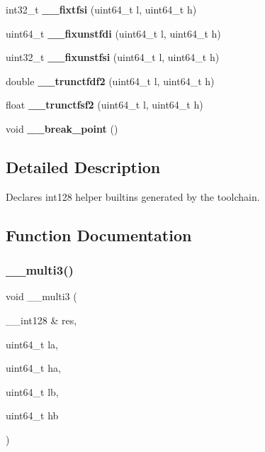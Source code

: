 \begin{DoxyCompactItemize}
\mbox{\label{group__compiler_gac2669376b81a47fc865f5ba54aea0720}} 
int32\+\_\+t {\bfseries \+\_\+\+\_\+fixtfsi} (uint64\+\_\+t l, uint64\+\_\+t h)
\item 
\mbox{\label{group__compiler_ga459b47b617b89052f544025349c165f8}} 
uint64\+\_\+t {\bfseries \+\_\+\+\_\+fixunstfdi} (uint64\+\_\+t l, uint64\+\_\+t h)
\item 
\mbox{\label{group__compiler_ga1c62ec774bd084b04118fdb2b019a5c3}} 
uint32\+\_\+t {\bfseries \+\_\+\+\_\+fixunstfsi} (uint64\+\_\+t l, uint64\+\_\+t h)
\item 
\mbox{\label{group__compiler_ga386f6c017043419d3d33f9e96cc4ae4c}} 
double {\bfseries \+\_\+\+\_\+trunctfdf2} (uint64\+\_\+t l, uint64\+\_\+t h)
\item 
\mbox{\label{group__compiler_ga0de0b2a5fe12abf258f7640987807a3a}} 
float {\bfseries \+\_\+\+\_\+trunctfsf2} (uint64\+\_\+t l, uint64\+\_\+t h)
\item 
\mbox{\label{group__compiler_ga612b3f8baa213fa0ce573eec10bbad78}} 
void {\bfseries \+\_\+\+\_\+break\+\_\+point} ()
\end{DoxyCompactItemize}


\subsection{Detailed Description}
Declares int128 helper builtins generated by the toolchain. 



\subsection{Function Documentation}
\mbox{\label{group__compiler_gaa03897335f1fcc54f469e17c32ae9920}} 
\subsubsection{\texorpdfstring{\+\_\+\+\_\+multi3()}{\_\_multi3()}}
{\footnotesize\ttfamily void \+\_\+\+\_\+multi3 (\begin{DoxyParamCaption}\item[{\+\_\+\+\_\+int128 \&}]{res,  }\item[{uint64\+\_\+t}]{la,  }\item[{uint64\+\_\+t}]{ha,  }\item[{uint64\+\_\+t}]{lb,  }\item[{uint64\+\_\+t}]{hb }\end{DoxyParamCaption})}



